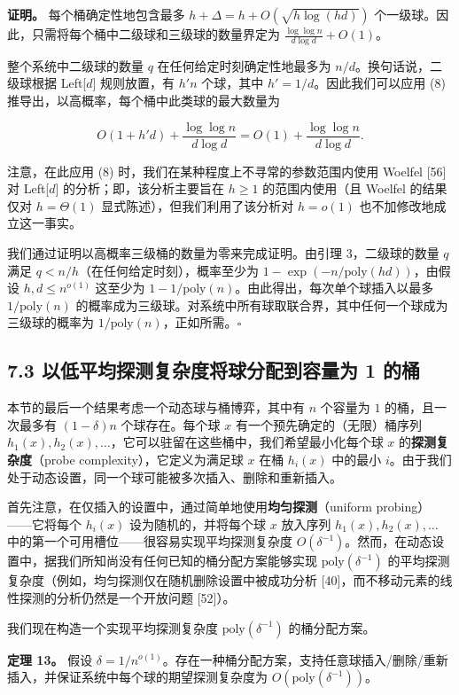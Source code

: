 \documentclass[12pt,a4paper]{ctexart}
\theoremstyle{remark}
\begin{document}
\textbf{证明。} 每个桶确定性地包含最多 $h+\Delta=h+O(\sqrt{h\log(hd)})$ 个一级球。因此，只需将每个桶中二级球和三级球的数量界定为 $\frac{\log\log n}{d\log d}+O(1)$。

整个系统中二级球的数量 $q$ 在任何给定时刻确定性地最多为 $n/d$。换句话说，二级球根据 Left[$d$] 规则放置，有 $h'n$ 个球，其中 $h'=1/d$。因此我们可以应用 (8) 推导出，以高概率，每个桶中此类球的最大数量为

$$O(1+h'd)+\frac{\log\log n}{d\log d}=O(1)+\frac{\log\log n}{d\log d}.$$

注意，在此应用 (8) 时，我们在某种程度上不寻常的参数范围内使用 Woelfel [56] 对 Left[$d$] 的分析；即，该分析主要旨在 $h\geq 1$ 的范围内使用（且 Woelfel 的结果仅对 $h=\Theta(1)$ 显式陈述），但我们利用了该分析对 $h=o(1)$ 也不加修改地成立这一事实。

我们通过证明以高概率三级桶的数量为零来完成证明。由引理 3，二级球的数量 $q$ 满足 $q<n/h$（在任何给定时刻），概率至少为 $1-\exp(-n/\text{poly}(hd))$，由假设 $h,d\leq n^{o(1)}$ 这至少为 $1-1/\text{poly}(n)$。由此得出，每次单个球插入以最多 $1/\text{poly}(n)$ 的概率成为三级球。对系统中所有球取联合界，其中任何一个球成为三级球的概率为 $1/\text{poly}(n)$，正如所需。$\square$

\subsection{7.3 以低平均探测复杂度将球分配到容量为 1 的桶}
本节的最后一个结果考虑一个动态球与桶博弈，其中有 $n$ 个容量为 $1$ 的桶，且一次最多有 $(1-\delta)n$ 个球存在。每个球 $x$ 有一个预先确定的（无限）桶序列 $h_1(x),h_2(x),\ldots$，它可以驻留在这些桶中，我们希望最小化每个球 $x$ 的\textbf{探测复杂度}（probe complexity），它定义为满足球 $x$ 在桶 $h_i(x)$ 中的最小 $i$。由于我们处于动态设置，同一个球可能被多次插入、删除和重新插入。

首先注意，在仅插入的设置中，通过简单地使用\textbf{均匀探测}（uniform probing）——它将每个 $h_i(x)$ 设为随机的，并将每个球 $x$ 放入序列 $h_1(x),h_2(x),\ldots$ 中的第一个可用槽位——很容易实现平均探测复杂度 $O(\delta^{-1})$。然而，在动态设置中，据我们所知尚没有任何已知的桶分配方案能够实现 $\text{poly}(\delta^{-1})$ 的平均探测复杂度（例如，均匀探测仅在随机删除设置中被成功分析 [40]，而不移动元素的线性探测的分析仍然是一个开放问题 [52]）。

我们现在构造一个实现平均探测复杂度 $\text{poly}(\delta^{-1})$ 的桶分配方案。

\textbf{定理 13。} 假设 $\delta=1/n^{o(1)}$。存在一种桶分配方案，支持任意球插入/删除/重新插入，并保证系统中每个球的期望探测复杂度为 $O(\text{poly}(\delta^{-1}))$。
\end{document}
